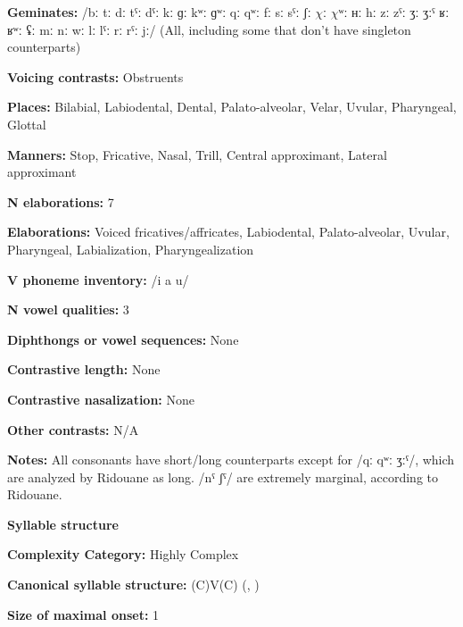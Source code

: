 \textbf{Geminates:} /bː tː dː tˤː dˤː kː ɡː kʷː ɡʷː qː qʷː fː sː sˤː ʃː $\chi ː$ $\chi ʷː$ ʜː hː zː zˤː ʒː ʒːˤ ʁː ʁʷː ʢː mː nː wː lː lˤː rː rˤː jː/ (All, including some that don’t have singleton counterparts)



\textbf{Voicing contrasts:} Obstruents



\textbf{Places:} Bilabial, Labiodental, Dental, Palato-alveolar, Velar, Uvular, Pharyngeal, Glottal



\textbf{Manners:} Stop, Fricative, Nasal, Trill, Central approximant, Lateral approximant



\textbf{N elaborations:} 7



\textbf{Elaborations:} Voiced fricatives/affricates, Labiodental, Palato-alveolar, Uvular, Pharyngeal, Labialization, Pharyngealization



\textbf{V phoneme inventory:} /i a u/



\textbf{N vowel qualities:} 3



\textbf{Diphthongs or vowel sequences:} None



\textbf{Contrastive length:} None



\textbf{Contrastive nasalization:} None



\textbf{Other contrasts:} N/A



\textbf{Notes:} All consonants have short/long counterparts except for /qː qʷː ʒːˤ/, which are analyzed by Ridouane as long. /nˤ ʃˤ/ are extremely marginal, according to Ridouane.



\textbf{Syllable structure}



\textbf{Complexity Category:} Highly Complex



\textbf{Canonical syllable structure:} (C)V(C) (\citealt{DellElmedlouai2002}, \citealt{Ridouane2008})



\textbf{Size of maximal onset:} 1



